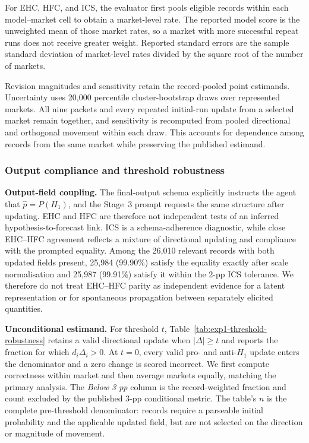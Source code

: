 For EHC, HFC, and ICS, the evaluator first pools eligible records within each
model--market cell to obtain a market-level rate.  The reported model score is the
unweighted mean of those market rates, so a market with more successful repeat runs
does not receive greater weight.  Reported standard errors are the sample standard
deviation of market-level rates divided by the square root of the number of markets.

Revision magnitudes and sensitivity retain the record-pooled point estimands.
Uncertainty uses 20,000 percentile cluster-bootstrap draws over represented markets.
All nine packets and every repeated initial-run update from a selected market remain
together, and sensitivity is recomputed from pooled directional and orthogonal
movement within each draw. This accounts for dependence among records from the same
market while preserving the published estimand.

\subsubsection{Output compliance and threshold robustness}
\label{app:exp1-threshold-robustness}

\noindent\textbf{Output-field coupling.}
The final-output schema explicitly instructs the agent that
$\hat p=P(H_1)$, and the Stage~3 prompt requests the same structure after
updating. EHC and HFC are therefore not independent tests of an inferred
hypothesis-to-forecast link. ICS is a schema-adherence diagnostic, while close
EHC--HFC agreement reflects a mixture of directional updating and compliance
with the prompted equality. Among the 26,010 relevant records with both updated
fields present, 25,984 (99.90\%) satisfy the equality exactly after scale
normalisation and 25,987 (99.91\%) satisfy it within the 2-pp ICS tolerance. We
therefore do not treat EHC--HFC parity as independent evidence for a latent
representation or for spontaneous propagation between separately elicited
quantities.

\noindent\textbf{Unconditional estimand.}
For threshold $t$, Table~\ref{tab:exp1-threshold-robustness} retains a valid
directional update when $|\Delta|\geq t$ and reports the fraction for which
$d_i\Delta_i>0$. At $t=0$, every valid pro- and anti-$H_1$ update enters the
denominator and a zero change is scored incorrect. We first compute correctness
within market and then average markets equally, matching the primary analysis.
The \emph{Below 3 pp} column is the record-weighted fraction and count excluded
by the published 3-pp conditional metric. The table's $n$ is the complete
pre-threshold denominator: records require a parseable initial probability and
the applicable updated field, but are not selected on the direction or magnitude
of movement.

